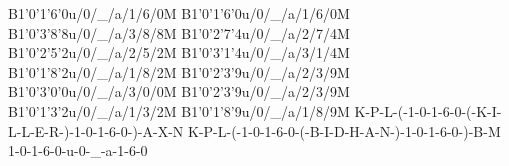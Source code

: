 B1'0'1'6'0u/0/_/a/1/6/0M
B1'0'1'6'0u/0/_/a/1/6/0M
B1'0'3'8'8u/0/_/a/3/8/8M
B1'0'2'7'4u/0/_/a/2/7/4M
B1'0'2'5'2u/0/_/a/2/5/2M
B1'0'3'1'4u/0/_/a/3/1/4M
B1'0'1'8'2u/0/_/a/1/8/2M
B1'0'2'3'9u/0/_/a/2/3/9M
B1'0'3'0'0u/0/_/a/3/0/0M
B1'0'2'3'9u/0/_/a/2/3/9M
B1'0'1'3'2u/0/_/a/1/3/2M
B1'0'1'8'9u/0/_/a/1/8/9M
K-P-L-(-1-0-1-6-0-(-K-I-L-L-E-R-)-1-0-1-6-0-)-A-X-N
K-P-L-(-1-0-1-6-0-(-B-I-D-H-A-N-)-1-0-1-6-0-)-B-M
1-0-1-6-0-u-0-_-a-1-6-0

